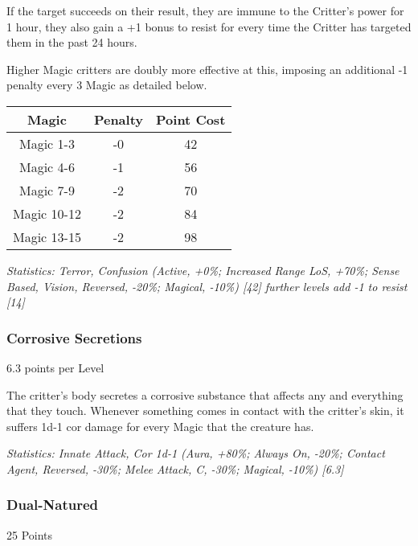 \begin{multicols*}{3}
	If the target succeeds on their result, they are immune to the Critter's power for 1 hour, they also gain a +1 bonus to resist for every time the Critter has targeted them in the past 24 hours.
	
	Higher Magic critters are doubly more effective at this, imposing an additional -1 penalty every 3 Magic as detailed below.
	
	\begin{center}
		\begin{tabular}{|c|c|c|}
			\hline
			Magic & Penalty & Point Cost\\
			\hline
			\hline
			Magic 1-3 & -0 & 42 \\
			Magic 4-6 & -1 & 56 \\
			Magic 7-9 & -2 & 70 \\
			Magic 10-12 & -2 & 84 \\
			Magic 13-15 & -2 & 98 \\
			\hline
		\end{tabular}
	\end{center}
	
	\textcolor{OliveGreen}{\textit{Statistics: Terror, Confusion (Active, +0\%; Increased Range LoS, +70\%; Sense Based, Vision, Reversed, -20\%; Magical, -10\%) [42] further levels add -1 to resist [14]
	}}

	\subsubsection{Corrosive Secretions}\label{corrosive_secretions}
	\begin{flushright}
		6.3 points per Level
	\end{flushright}

	The critter's body secretes a corrosive substance that affects any and everything that they touch. Whenever something comes in contact with the critter's skin, it suffers 1d-1 cor damage for every Magic that the creature has.

	\textcolor{OliveGreen}{\textit{Statistics:  Innate Attack, Cor 1d-1 (Aura, +80\%; Always On, -20\%; Contact Agent, Reversed, -30\%; Melee Attack, C, -30\%; Magical, -10\%) [6.3] }}


	\subsubsection{Dual-Natured}\label{dual_natured}
	\begin{flushright}
		25 Points
	\end{flushright}


\end{multicols*}
